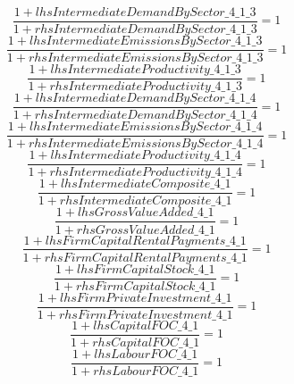 \begin{dmath}
\frac{1+{lhsIntermediateDemandBySector\_4\_1\_3}}{1+{rhsIntermediateDemandBySector\_4\_1\_3}}=1
\end{dmath}
\begin{dmath}
\frac{1+{lhsIntermediateEmissionsBySector\_4\_1\_3}}{1+{rhsIntermediateEmissionsBySector\_4\_1\_3}}=1
\end{dmath}
\begin{dmath}
\frac{1+{lhsIntermediateProductivity\_4\_1\_3}}{1+{rhsIntermediateProductivity\_4\_1\_3}}=1
\end{dmath}
\begin{dmath}
\frac{1+{lhsIntermediateDemandBySector\_4\_1\_4}}{1+{rhsIntermediateDemandBySector\_4\_1\_4}}=1
\end{dmath}
\begin{dmath}
\frac{1+{lhsIntermediateEmissionsBySector\_4\_1\_4}}{1+{rhsIntermediateEmissionsBySector\_4\_1\_4}}=1
\end{dmath}
\begin{dmath}
\frac{1+{lhsIntermediateProductivity\_4\_1\_4}}{1+{rhsIntermediateProductivity\_4\_1\_4}}=1
\end{dmath}
\begin{dmath}
\frac{1+{lhsIntermediateComposite\_4\_1}}{1+{rhsIntermediateComposite\_4\_1}}=1
\end{dmath}
\begin{dmath}
\frac{1+{lhsGrossValueAdded\_4\_1}}{1+{rhsGrossValueAdded\_4\_1}}=1
\end{dmath}
\begin{dmath}
\frac{1+{lhsFirmCapitalRentalPayments\_4\_1}}{1+{rhsFirmCapitalRentalPayments\_4\_1}}=1
\end{dmath}
\begin{dmath}
\frac{1+{lhsFirmCapitalStock\_4\_1}}{1+{rhsFirmCapitalStock\_4\_1}}=1
\end{dmath}
\begin{dmath}
\frac{1+{lhsFirmPrivateInvestment\_4\_1}}{1+{rhsFirmPrivateInvestment\_4\_1}}=1
\end{dmath}
\begin{dmath}
\frac{1+{lhsCapitalFOC\_4\_1}}{1+{rhsCapitalFOC\_4\_1}}=1
\end{dmath}
\begin{dmath}
\frac{1+{lhsLabourFOC\_4\_1}}{1+{rhsLabourFOC\_4\_1}}=1
\end{dmath}

